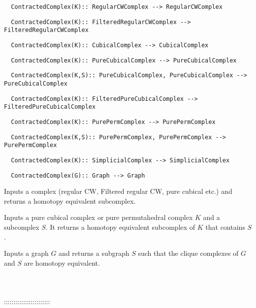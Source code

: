 \documentclass[a4paper,11pt]{report}
\begin{document}
{\begin{verbatim}  ContractedComplex(K):: RegularCWComplex --> RegularCWComplex
\end{verbatim}
 
\begin{verbatim}  ContractedComplex(K):: FilteredRegularCWComplex --> FilteredRegularCWComplex
\end{verbatim}
 
\begin{verbatim}  ContractedComplex(K):: CubicalComplex --> CubicalComplex
\end{verbatim}
 
\begin{verbatim}  ContractedComplex(K):: PureCubicalComplex --> PureCubicalComplex
\end{verbatim}
 
\begin{verbatim}  ContractedComplex(K,S):: PureCubicalComplex, PureCubicalComplex --> PureCubicalComplex
\end{verbatim}
 
\begin{verbatim}  ContractedComplex(K):: FilteredPureCubicalComplex --> FilteredPureCubicalComplex
\end{verbatim}
 
\begin{verbatim}  ContractedComplex(K):: PurePermComplex --> PurePermComplex
\end{verbatim}
 
\begin{verbatim}  ContractedComplex(K,S):: PurePermComplex, PurePermComplex --> PurePermComplex
\end{verbatim}
 
\begin{verbatim}  ContractedComplex(K):: SimplicialComplex --> SimplicialComplex
\end{verbatim}
 
\begin{verbatim}  ContractedComplex(G):: Graph --> Graph
\end{verbatim}
 

 Inputs a complex (regular CW, Filtered regular CW, pure cubical etc.) and
returns a homotopy equivalent subcomplex. 

 Inputs a pure cubical complex or pure permutahedral complex $K$ and a subcomplex $S$. It returns a homotopy equivalent subcomplex of $K$ that contains $S$. 

 Inputs a graph $G$ and returns a subgraph $S$ such that the clique complexes of $G$ and $S$ are homotopy equivalent. \\
 \\
 \\
 \\
 ::::::::::::::::::::::::\\
 
}
\end{document}
